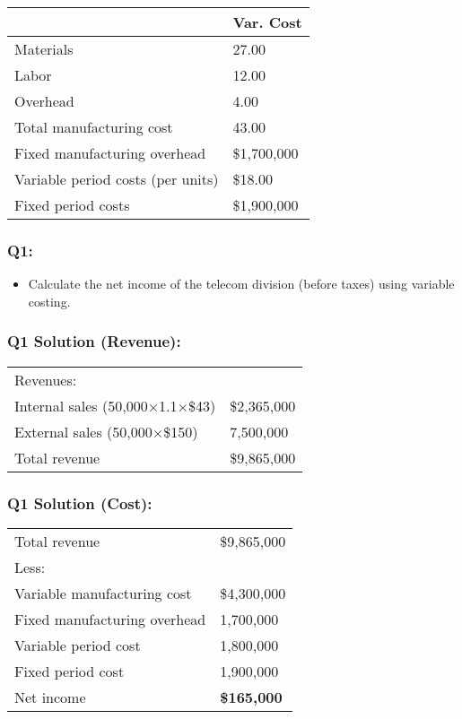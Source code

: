 \begin{longtable}[]{@{}ll@{}}
\toprule\noalign{}
& Var. Cost \\
\midrule\noalign{}
\endhead
\bottomrule\noalign{}
\endlastfoot
Materials & 27.00 \\
Labor & 12.00 \\
Overhead & 4.00 \\
Total manufacturing cost & 43.00 \\
Fixed manufacturing overhead & \$1,700,000 \\
Variable period costs (per units) & \$18.00 \\
Fixed period costs & \$1,900,000 \\
\end{longtable}

\hypertarget{q1-1}{%
\subsubsection{Q1:}\label{q1-1}}

\begin{itemize}
\tightlist
\item
  Calculate the net income of the telecom division (before taxes) using
  variable costing.
\end{itemize}

\hypertarget{q1-solution-revenue}{%
\subsubsection{Q1 Solution (Revenue):}\label{q1-solution-revenue}}

\begin{longtable}[]{@{}ll@{}}
\toprule\noalign{}
\endhead
\bottomrule\noalign{}
\endlastfoot
Revenues: & \\
Internal sales {(50,000×1.1×\$43)} & \$2,365,000 \\
External sales {(50,000×\$150)} & 7,500,000 \\
Total revenue & \$9,865,000 \\
\end{longtable}

\hypertarget{q1-solution-cost}{%
\subsubsection{Q1 Solution (Cost):}\label{q1-solution-cost}}

\begin{longtable}[]{@{}ll@{}}
\toprule\noalign{}
\endhead
\bottomrule\noalign{}
\endlastfoot
Total revenue & \$9,865,000 \\
Less: & \\
Variable manufacturing cost & \$4,300,000 \\
Fixed manufacturing overhead & 1,700,000 \\
Variable period cost & 1,800,000 \\
Fixed period cost & 1,900,000 \\
Net income & \textbf{\$165,000} \\
\end{longtable}

